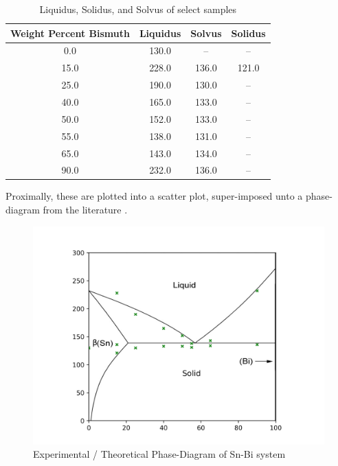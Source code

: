 \documentclass{article}
\begin{document}
\begin{table}[!h!]
    \centering
    \def\arraystretch{1.5}
    \caption{Liquidus, Solidus, and Solvus of select samples}
    \begin{tabular}{|c|c|c|c|}
       \toprule
       \hline
        Weight Percent Bismuth & Liquidus & Solvus & Solidus \\ 
         \midrule 
         \hline 
        
        0.0 & 130.0 & -- & --\\ 
          
         \hline 
        
        15.0 & 228.0 & 136.0 & 121.0\\ 
          
         \hline 
        
        25.0 & 190.0 & 130.0 & --\\ 
          
         \hline 
        
        40.0 & 165.0 & 133.0 & --\\ 
          
         \hline 
        
        50.0 & 152.0 & 133.0 & --\\ 
          
         \hline 
        
        55.0 & 138.0 & 131.0 & --\\ 
          
         \hline 
        
        65.0 & 143.0 & 134.0 & --\\ 
          
         \hline 
        
        90.0 & 232.0 & 136.0 & --\\ 
          
         \hline 
    \end{tabular}
    \label{tab:my_label}
\end{table}

Proximally, these are plotted into a scatter plot, super-imposed unto a phase-diagram from the literature \cite{nist}.

\begin{figure}[!h!]
    \centering
    \includegraphics[width=0.5\linewidth]{plots/q4_phase.png}
    \caption{Experimental / Theoretical Phase-Diagram of Sn-Bi system}
    \label{fig:q4fig}
\end{figure}
\end{document}
